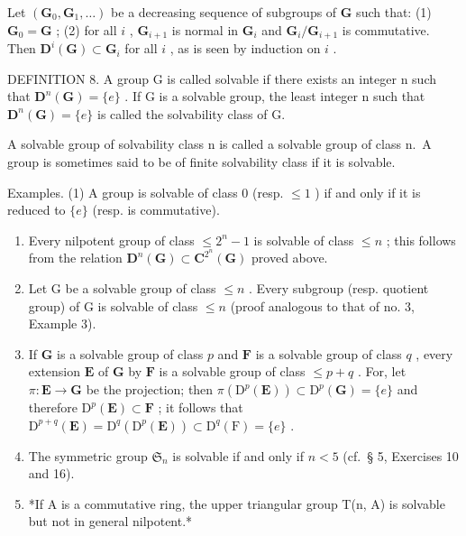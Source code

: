 Let \((\mathbf{G}_0, \mathbf{G}_1, \ldots)\) be a decreasing sequence of subgroups of \(\mathbf{G}\) such that: (1) \(\mathbf{G}_0 = \mathbf{G}\) ; (2) for all \(i\) , \(\mathbf{G}_{i+1}\) is normal in \(\mathbf{G}_i\) and \(\mathbf{G}_i / \mathbf{G}_{i+1}\) is commutative. Then \(\mathbf{D}^i(\mathbf{G}) \subset \mathbf{G}_i\) for all \(i\) , as is seen by induction on \(i\) .

DEFINITION 8. A group G is called solvable if there exists an integer n such that \(\mathbf{D}^{n}(\mathbf{G})=\{e\}\) . If G is a solvable group, the least integer n such that \(\mathbf{D}^{n}(\mathbf{G})=\{e\}\) is called the solvability class of G.

A solvable group of solvability class n is called a solvable group of class n.~A group is sometimes said to be of finite solvability class if it is solvable.

Examples. (1) A group is solvable of class 0 (resp. \(\leqslant 1\) ) if and only if it is reduced to \(\{e\}\) (resp. is commutative).

\begin{enumerate}
\def\labelenumi{(\arabic{enumi})}
\setcounter{enumi}{1}
\item
  Every nilpotent group of class \(\leqslant 2^{n} - 1\) is solvable of class \(\leqslant n\) ; this follows from the relation \(\mathbf{D}^n (\mathbf{G})\subset \mathbf{C}^{2^n}(\mathbf{G})\) proved above.
\item
  Let G be a solvable group of class \(\leqslant n\) . Every subgroup (resp. quotient group) of G is solvable of class \(\leqslant n\) (proof analogous to that of no. 3, Example 3).
\item
  If \(\mathbf{G}\) is a solvable group of class \(p\) and \(\mathbf{F}\) is a solvable group of class \(q\) , every extension \(\mathbf{E}\) of \(\mathbf{G}\) by \(\mathbf{F}\) is a solvable group of class \(\leqslant p + q\) . For, let \(\pi: \mathbf{E} \to \mathbf{G}\) be the projection; then \(\pi(\mathrm{D}^p(\mathbf{E})) \subset \mathrm{D}^p(\mathbf{G}) = \{e\}\) and therefore \(\mathrm{D}^p(\mathbf{E}) \subset \mathbf{F}\) ; it follows that \(\mathrm{D}^{p+q}(\mathbf{E}) = \mathrm{D}^q(\mathrm{D}^p(\mathbf{E})) \subset \mathrm{D}^q(\mathrm{F}) = \{e\}\) .
\item
  The symmetric group \(\mathfrak{S}_n\) is solvable if and only if \(n < 5\) (cf.~§ 5, Exercises 10 and 16).
\item
  *If A is a commutative ring, the upper triangular group T(n, A) is solvable but not in general nilpotent.*
\end{enumerate}

